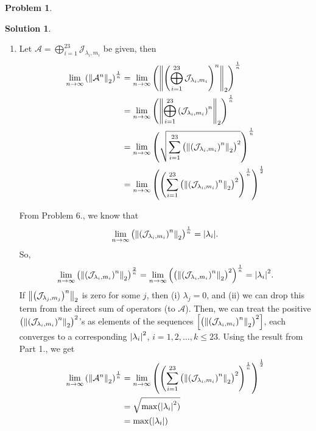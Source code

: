 \documentclass{book}
\theoremstyle{definition}
\newtheorem*{prob*}{Problem}
\newtheorem*{sln*}{Solution}
\newcommand{\A}{\mathcal{A}}
\newcommand{\jor}{\mathcal{J}}
\begin{document}
\begin{prob*}
\begin{sln*}
\begin{enumerate}
		
		
		
		
			\item Let $\A= \bigoplus^{23}_{i=1} \jor_{\lambda_i, m_i}$ be given, then 
			\begin{align*}
			\lim\limits_{n\to\infty}\left( \norm{\A^n}_2 \right)^{\frac{1}{n}} &= \lim\limits_{n\to\infty}\left( \norm{\left(\bigoplus^{23}_{i=1} \jor_{\lambda_i, m_i}\right)^n}_2 \right)^{\frac{1}{n}}\\
			&= \lim\limits_{n\to\infty}\left( \norm{\bigoplus^{23}_{i=1}\left( \jor_{\lambda_i, m_i}\right)^n}_2 \right)^{\frac{1}{n}}\\
			&= \lim\limits_{n\to\infty}\left( \sqrt{\sum^{23}_{i=1}\left( \norm{\left( \jor_{\lambda_i, m_i}\right)^n}_2\right)^2} \right)^{\frac{1}{n}}\\
			&= \lim\limits_{n\to\infty}\left( \left( \sum^{23}_{i=1}\left( \norm{\left( \jor_{\lambda_i, m_i}\right)^n}_2\right)^2 \right)^\frac{1}{n}\right)^{\frac{1}{2}}
			\end{align*}
			
			
			
			From Problem 6., we know that
			\begin{align*}
			\lim\limits_{n\to\infty} \left(  \norm{\left(\jor_{\lambda_i,m_i}\right)^n}_2 \right)^{\frac{1}{n}}  =  \abs{\lambda_i}.
			\end{align*}
			So,
			\begin{align*}
			\lim\limits_{n\to\infty} \left(  \norm{\left(\jor_{\lambda_i,m_i}\right)^n}_2 \right)^{\frac{2}{n}}  = \lim\limits_{n\to\infty} \left(\left(  \norm{\left(\jor_{\lambda_i,m_i}\right)^n}_2 \right)^2\right)^{\frac{1}{n}}  =   \abs{\lambda_i}^2.
			\end{align*}
			If $\norm{\left(\jor_{\lambda_j,m_j}\right)^n}_2$ is zero for some $j$, then (i) $\lambda_j = 0$, and (ii) we can drop this term from the direct sum of operators (to $\A$). Then, we can treat the positive $\left(\norm{\left(\jor_{\lambda_i,m_i}\right)^n}_2\right)^2$'s as elements of the sequences $\left[\left(\norm{\left(\jor_{\lambda_i,m_i}\right)^n}_2\right)^2\right]$, each converges to a corresponding $\abs{\lambda_i}^2$, $i=1,2,\dots,k \leq 23$. Using the result from Part 1., we get
			\begin{align*}
			\lim\limits_{n\to\infty}\left( \norm{\A^n}_2 \right)^{\frac{1}{n}}
			&= \lim\limits_{n\to\infty}\left( \left( \sum^{23}_{i=1}\left( \norm{\left( \jor_{\lambda_i, m_i}\right)^n}_2\right)^2 \right)^\frac{1}{n}\right)^{\frac{1}{2}}\\
			&= \sqrt{\max(\abs{\lambda_i}^2)}\\
			&= \max(\abs{\lambda_i})
			\end{align*}
			
			
			
			
		\end{enumerate}
	\end{sln*}
\end{prob*}
\end{document}
